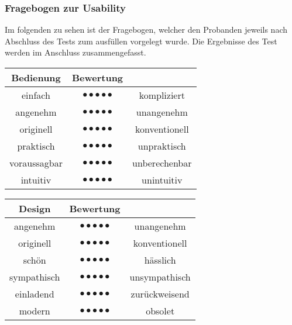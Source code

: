 \subsubsection*{Fragebogen zur Usability}
Im folgenden zu sehen ist der Fragebogen, welcher den Probanden jeweils nach
Abschluss des Tests zum ausfüllen vorgelegt wurde. Die Ergebnisse des Test
werden im Anschluss zusammengefasst.

\begin{center}
  \begin{tabular}{ c c c }
    \toprule
    \textbf{Bedienung} & \textbf{Bewertung} &  \\ \midrule
    einfach &$ \bullet\bullet\bullet\bullet\bullet$ & kompliziert \\ \midrule
    angenehm &$ \bullet\bullet\bullet\bullet\bullet$ & unangenehm \\  \midrule
    originell &$ \bullet\bullet\bullet\bullet\bullet$ & konventionell \\ \midrule
    praktisch &$ \bullet\bullet\bullet\bullet\bullet$ & unpraktisch \\ \midrule
    voraussagbar &$ \bullet\bullet\bullet\bullet\bullet$ & unberechenbar \\ \midrule
    intuitiv &$ \bullet\bullet\bullet\bullet\bullet$ & unintuitiv \\
    \bottomrule
  \end{tabular}
\end{center}

\begin{center}
  \begin{tabular}{ c c c }
    \toprule
    \textbf{Design} & \textbf{Bewertung} &  \\ \midrule
    angenehm &$ \bullet\bullet\bullet\bullet\bullet$ & unangenehm \\ \midrule
    originell &$ \bullet\bullet\bullet\bullet\bullet$ & konventionell \\  \midrule
    schön &$ \bullet\bullet\bullet\bullet\bullet$ & hässlich \\ \midrule
    sympathisch &$ \bullet\bullet\bullet\bullet\bullet$ & unsympathisch \\ \midrule
    einladend &$ \bullet\bullet\bullet\bullet\bullet$ & zurückweisend \\ \midrule
    modern &$ \bullet\bullet\bullet\bullet\bullet$ & obsolet \\
    \bottomrule
  \end{tabular}
\end{center}
\vspace{1cm}
